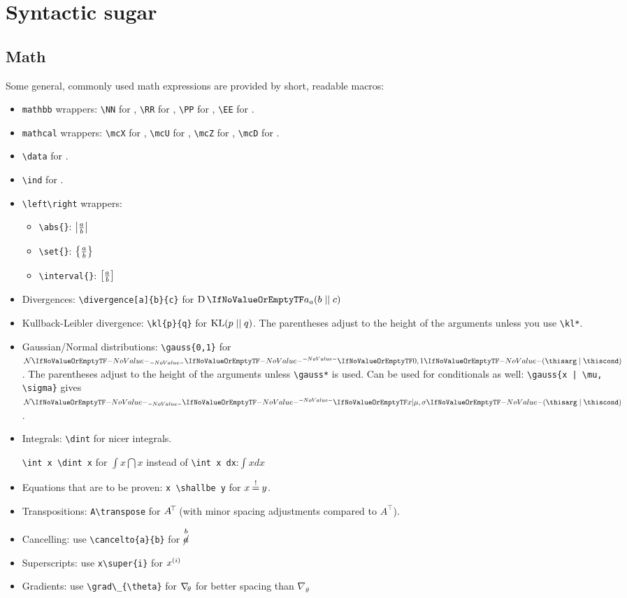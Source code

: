 \section{Syntactic sugar}
\subsection{Math}
Some general, commonly used math expressions are provided by short, readable macros:
\begin{itemize}
	\item \verb|mathbb| wrappers: \verb|\NN| for \NN, \verb|\RR| for \RR, \verb|\PP| for \PP, \verb|\EE| for \EE.
	\item \verb|mathcal| wrappers: \verb|\mcX| for \mcX, \verb|\mcU| for \mcU, \verb|\mcZ| for \mcZ, \verb|\mcD| for \mcD.
	\item \verb|\data| for \data.
	\item \verb|\ind| for \ind.	
	\item \verb|\left\right| wrappers:
		\begin{itemize}
			\item \verb|\abs{}|: $ \abs{\frac a b }$ 
			\item \verb|\set{}|: $ \set{\frac ab }$	
			\item\verb|\interval{}|: $ \interval{\frac ab} $
		\end{itemize}
	\item Divergences: \verb|\divergence[a]{b}{c}| for $\divergence[a]{b}{c}$
	\item Kullback-Leibler divergence: \verb|\kl{p}{q}| for $\kl{p}{q}$. 
	The parentheses adjust to the height of the arguments unless you use \verb|\kl*|.
	\item Gaussian/Normal distributions: \verb|\gauss{0,1}| for $\gauss{0, 1}$. The parentheses adjust to the height of the arguments unless \verb|\gauss*| is used. 
	Can be used for conditionals as well: \verb+\gauss{x | \mu, \sigma}+ gives $\gauss{x | \mu, \sigma}$.
	\item Integrals: \verb|\dint| for nicer integrals.
	
		\verb|\int x \dint x| for $\int x \dint x$ instead of \verb|\int x dx|:$\int x dx$
	\item Equations that are to be proven: \verb|x \shallbe y| for $x \shallbe y$. 
	\item Transpositions: \verb|A\transpose| for $A\transpose$ (with minor spacing adjustments compared to $A^\top$).
	\item Cancelling: use \verb|\cancelto{a}{b}| for $\cancelto{a}{b}$
	\item Superscripts: use \verb|x\super{i}| for $x\super{i}$
	\item Gradients: use \verb|\grad\_{\theta}| for $\grad_{\theta}$ for better spacing than $\nabla_\theta$
\end{itemize}
